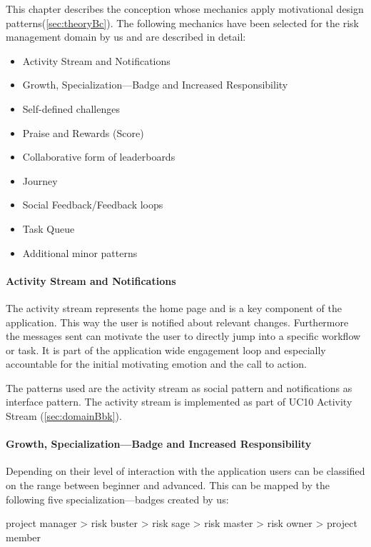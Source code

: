 This chapter describes the conception whose mechanics apply motivational design patterns(\ref{sec:theoryBc}).
The following mechanics have been selected for the risk management domain by us and are described in detail:
\begin{itemize}
	\item Activity Stream and Notifications
	\item Growth, Specialization—Badge and Increased Responsibility
	\item Self-defined challenges
	\item Praise and Rewards (Score)
	\item Collaborative form of leaderboards
	\item Journey
	\item Social Feedback/Feedback loops
	\item Task Queue
	\item Additional minor patterns
\end{itemize}

\paragraph*{Activity Stream and Notifications}
The activity stream represents the home page and is a key component of the application. This way the user is notified about relevant changes. Furthermore the messages sent can motivate the user to directly jump into a specific workflow or task. 
It is part of the application wide engagement loop and especially accountable for the initial motivating emotion and the call to action.

The patterns used are the activity stream as social pattern and notifications as interface pattern.
The activity stream is implemented as part of \ac{UC}10 Activity Stream (\ref{sec:domainBbk}).

\paragraph*{Growth, Specialization—Badge and Increased Responsibility}

Depending on their level of interaction with the application users can be classified on the range between beginner and advanced. This can be mapped by the following five specialization—badges created by us:

project manager > risk buster > risk sage > risk master > risk owner > project member

